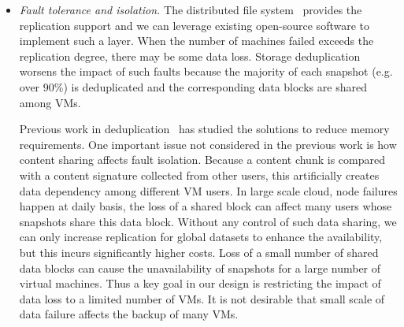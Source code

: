 \begin{itemize}
\item {\em Fault tolerance and isolation.}
The distributed file system~\cite{GoogleFS,Hadoop} provides the replication support
and we can leverage existing open-source software to implement such a layer.
When the number of machines failed exceeds the replication degree, there may be
 some data loss.  Storage deduplication worsens the impact of such faults
because  the majority of each snapshot (e.g. over 90\%) is deduplicated
and the corresponding data blocks are shared among VMs.

Previous work in deduplication~\cite{extreme_binning09,sparseindex09} has
studied the solutions to reduce memory requirements.
One important issue not considered in the previous work is how content sharing affects
fault isolation.
Because a content chunk is compared with a content signature collected from other users,
this artificially creates data dependency among different VM users.
In large scale cloud, node failures happen at daily basis,
the loss of a shared block can affect many users whose snapshots share this 
data block. 
Without any control of such data sharing, we can only increase  
replication for global datasets to enhance the availability,
but this incurs significantly higher costs.
Loss of a small number of shared data blocks can 
cause the unavailability of snapshots for a large number of virtual machines.
Thus a key goal  in our design
is restricting the impact of  data loss to a limited number of VMs. 
It is not desirable that small scale of data failure affects the backup of many VMs.

\end{itemize}

